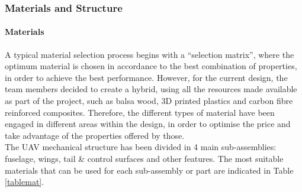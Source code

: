 \documentclass[12pt]{article}
\begin{document}
\newpage

\subsubsection{Materials and Structure}

\paragraph{Materials}
A typical material selection process begins with a “selection matrix”, where the optimum material is chosen in accordance to the best combination of properties, in order to achieve the best performance. However, for the current design, the team members decided to create a hybrid, using all the resources made available as part of the project, such as balsa wood, 3D printed plastics and carbon fibre reinforced composites. Therefore, the different types of material have been engaged in different areas within the design, in order to optimise the price and take advantage of the properties offered by those. \\

\noindent The UAV mechanical structure has been divided in 4 main sub-assemblies: fuselage, wings, tail \& control surfaces and other features. The most suitable materials that can be used for each sub-assembly or part are indicated in Table \ref{tablemat}. \\
\end{document}
